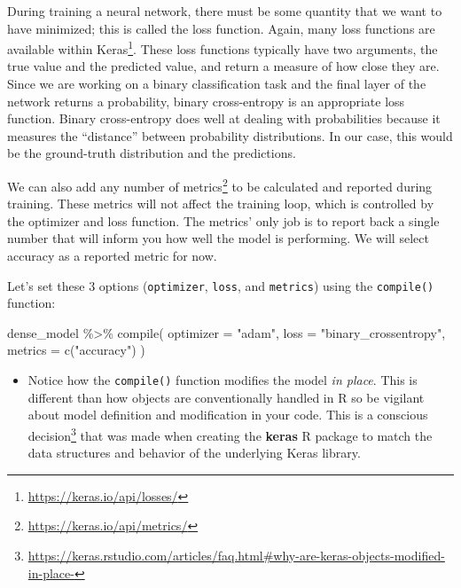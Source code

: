 \documentclass[
]{krantz}
\makeatletter
\newenvironment{Shaded}{\begin{snugshade}}{\end{snugshade}}
\newcommand{\AttributeTok}[1]{\textcolor[rgb]{0.77,0.63,0.00}{#1}}
\newcommand{\FunctionTok}[1]{\textcolor[rgb]{0.00,0.00,0.00}{#1}}
\newcommand{\NormalTok}[1]{#1}
\newcommand{\SpecialCharTok}[1]{\textcolor[rgb]{0.00,0.00,0.00}{#1}}
\newcommand{\StringTok}[1]{\textcolor[rgb]{0.31,0.60,0.02}{#1}}
\DeclareRobustCommand{\href}[2]{#2\footnote{\url{#1}}}
\renewcommand{\href}[2]{#2\footnote{\url{#1}}}
\newenvironment{kframe}{%
\medskip{}
\setlength{\fboxsep}{.8em}
 \def\at@end@of@kframe{}%
 \ifinner\ifhmode%
  \def\at@end@of@kframe{\end{minipage}}%
  \begin{minipage}{\columnwidth}%
 \fi\fi%
 \def\FrameCommand##1{\hskip\@totalleftmargin \hskip-\fboxsep
 \colorbox{shadecolor}{##1}\hskip-\fboxsep
     \hskip-\linewidth \hskip-\@totalleftmargin \hskip\columnwidth}%
 \MakeFramed {\advance\hsize-\width
   \@totalleftmargin\z@ \linewidth\hsize
   \@setminipage}}%
 {\par\unskip\endMakeFramed%
 \at@end@of@kframe}
\renewenvironment{Shaded}{\begin{kframe}}{\end{kframe}}
\newenvironment{rmdblock}[1]
  {\begin{shaded*}
  \begin{itemize}[left = -1cm, labelsep = 1cm]
  \renewcommand{\labelitemi}{
    \raisebox{-.7\height}[0pt][0pt]{
      {\setkeys{Gin}{width=3em,keepaspectratio}\texttt{[image: images/\#1]}}
    }
  }
 
  \item
  }
  {
  \end{itemize}
  \end{shaded*}
  }
\newenvironment{rmdnote}
  {\begin{rmdblock}{note}}
  {\end{rmdblock}}
\makeatother
\begin{document}

During training a neural network, there must be some quantity that we want to have minimized; this is called the loss function. Again, many loss functions are available within Keras\footnote{\url{https://keras.io/api/losses/}}. These loss functions typically have two arguments, the true value and the predicted value, and return a measure of how close they are.
Since we are working on a binary classification task and the final layer of the network returns a probability, binary cross-entropy is an appropriate loss function. Binary cross-entropy does well at dealing with probabilities because it measures the ``distance'' between probability distributions. In our case, this would be the ground-truth distribution and the predictions.

We can also add any number of metrics\footnote{\url{https://keras.io/api/metrics/}} to be calculated and reported during training. These metrics will not affect the training loop, which is controlled by the optimizer and loss function. The metrics' only job is to report back a single number that will inform you how well the model is performing. We will select accuracy as a reported metric for now.

Let's set these 3 options (\texttt{optimizer}, \texttt{loss}, and \texttt{metrics}) using the \texttt{compile()} function:

\begin{Shaded}
\begin{Highlighting}[]
\NormalTok{dense\_model }\SpecialCharTok{\%\textgreater{}\%} \FunctionTok{compile}\NormalTok{(}
  \AttributeTok{optimizer =} \StringTok{"adam"}\NormalTok{,}
  \AttributeTok{loss =} \StringTok{"binary\_crossentropy"}\NormalTok{,}
  \AttributeTok{metrics =} \FunctionTok{c}\NormalTok{(}\StringTok{"accuracy"}\NormalTok{)}
\NormalTok{)}
\end{Highlighting}
\end{Shaded}

\begin{rmdnote}
Notice how the \texttt{compile()} function modifies the model \emph{in
place}. This is different than how objects are conventionally handled in
R so be vigilant about model definition and modification in your code.
This is a
\href{https://keras.rstudio.com/articles/faq.html\#why-are-keras-objects-modified-in-place-}{conscious
decision} that was made when creating the \textbf{keras} R package to
match the data structures and behavior of the underlying Keras library.
\end{rmdnote}
\end{document}
